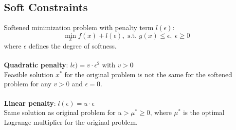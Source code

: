 \documentclass[english]{latex4ei/latex4ei_sheet}
\begin{document}
\begin{sectionbox}
\subsection{Soft Constraints}
Softened minimization problem with penalty term $l(\epsilon)$:
$$\min_{x}f(x)+l(\epsilon), \text{ s.t. }g(x)\leq\epsilon,\;\epsilon \geq 0$$
where $\epsilon$ defines the degree of softness.\\
\\
\textbf{Quadratic penalty}: $l\epsilon)=v\cdot\epsilon^{2}$ with $v>0$\\
Feasible solution $x^*$ for the original problem is not the same for the softened problem for any $v>0$ and $\epsilon=0$.\\
\\
\textbf{Linear penalty}: $l(\epsilon)=u\cdot\epsilon$\\
Same solution as original problem for $u>\mu^*\geq 0$, where $\mu^*$ is the optimal Lagrange multiplier for the original problem.

\end{sectionbox}
\end{document}
